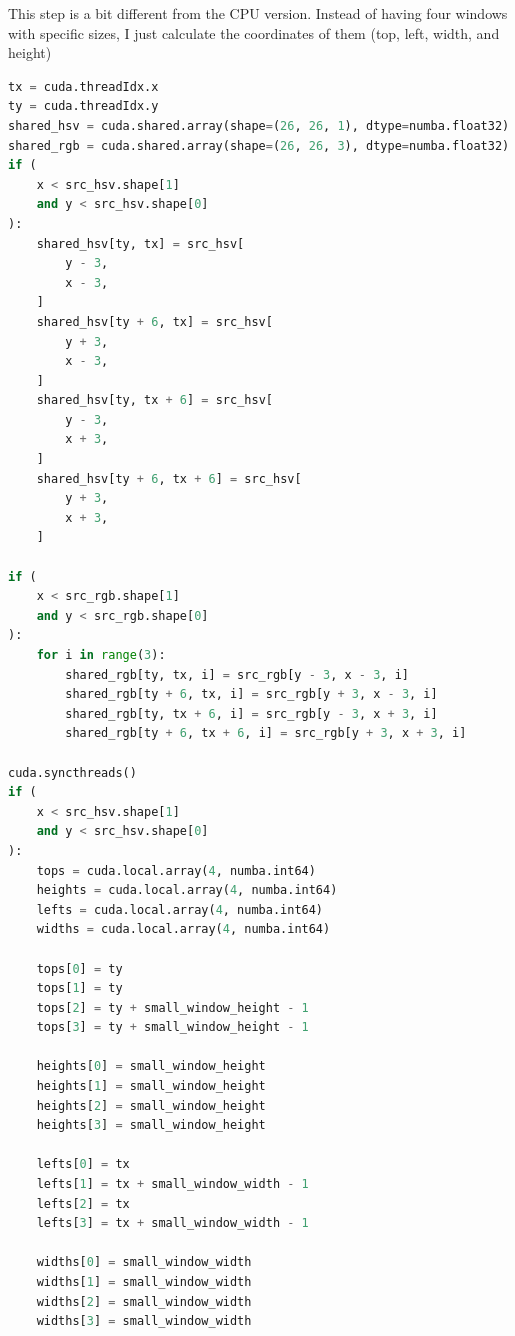 \documentclass[12pt]{article}
\begin{document}
\noindent
This step is a bit different from the CPU version. Instead of having four windows with specific sizes, I just calculate the coordinates of them (top, left, width, and height)
\begin{lstlisting}[language=Python]
tx = cuda.threadIdx.x
ty = cuda.threadIdx.y
shared_hsv = cuda.shared.array(shape=(26, 26, 1), dtype=numba.float32)
shared_rgb = cuda.shared.array(shape=(26, 26, 3), dtype=numba.float32)
if (
    x < src_hsv.shape[1]
    and y < src_hsv.shape[0]
):
    shared_hsv[ty, tx] = src_hsv[
        y - 3,
        x - 3,
    ]
    shared_hsv[ty + 6, tx] = src_hsv[
        y + 3,
        x - 3,
    ]
    shared_hsv[ty, tx + 6] = src_hsv[
        y - 3,
        x + 3,
    ]
    shared_hsv[ty + 6, tx + 6] = src_hsv[
        y + 3,
        x + 3,
    ]

if (
    x < src_rgb.shape[1]
    and y < src_rgb.shape[0]
):
    for i in range(3):
        shared_rgb[ty, tx, i] = src_rgb[y - 3, x - 3, i]
        shared_rgb[ty + 6, tx, i] = src_rgb[y + 3, x - 3, i]
        shared_rgb[ty, tx + 6, i] = src_rgb[y - 3, x + 3, i]
        shared_rgb[ty + 6, tx + 6, i] = src_rgb[y + 3, x + 3, i]

cuda.syncthreads()
if (
    x < src_hsv.shape[1]
    and y < src_hsv.shape[0] 
):
    tops = cuda.local.array(4, numba.int64)
    heights = cuda.local.array(4, numba.int64)
    lefts = cuda.local.array(4, numba.int64)
    widths = cuda.local.array(4, numba.int64)

    tops[0] = ty
    tops[1] = ty
    tops[2] = ty + small_window_height - 1
    tops[3] = ty + small_window_height - 1

    heights[0] = small_window_height
    heights[1] = small_window_height
    heights[2] = small_window_height
    heights[3] = small_window_height

    lefts[0] = tx
    lefts[1] = tx + small_window_width - 1
    lefts[2] = tx
    lefts[3] = tx + small_window_width - 1

    widths[0] = small_window_width
    widths[1] = small_window_width
    widths[2] = small_window_width
    widths[3] = small_window_width
\end{lstlisting}
\end{document}
